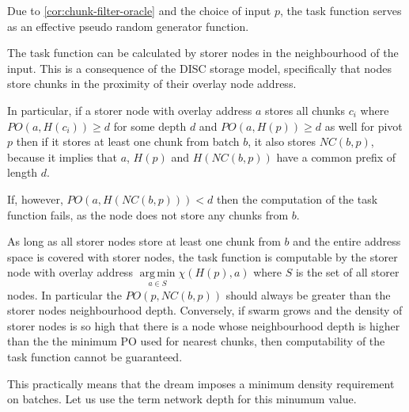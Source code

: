 \begin{corollary}
\label{cor:task-function-oracle}
Due to \ref{cor:chunk-filter-oracle} and the choice of input $p$, the task function serves as an effective pseudo random generator function.
\end{corollary}


\begin{corollary}
\label{cor:task-function-locality}
The task function can be calculated by storer nodes in the neighbourhood of the input. This is a consequence of the DISC storage model, specifically that nodes store chunks in the proximity of their overlay node address.

In particular, if a storer node with overlay address $a$ stores all chunks $c_i$ where $\mathit{PO}(a,\mathit{H}(c_i))\geq d$ for some depth $d$ and $\mathit{PO}(a,\mathit{H}(p))\geq d$ as well for pivot $p$ then if it stores at least one chunk from batch $b$, it also stores $NC(b,p)$, because it implies that $a$, $\mathit{H}(p)$ and $\mathit{H}(NC(b,p))$ have a common prefix of length $d$.

If, however, $\mathit{PO}(a,\mathit{H}(NC(b,p)))<d$ then the computation of the task function fails, as the node does not store any chunks from $b$.

As long as all storer nodes store at least one chunk from $b$ and the entire address space is covered with storer nodes, the task function is computable by the storer node with overlay address $\underset{a\in S}{\operatorname{arg\,min}}\chi(\mathit{H}(p), a)$ where $S$ is the set of all storer nodes.
In particular the $\mathit{PO}(p,\mathit{NC}(b,p))$ should always be greater than the storer nodes neighbourhood depth. Conversely, if swarm grows and the density of storer nodes is so high that there is a node whose neighbourhood  depth is higher than the the minimum PO used for nearest chunks, then computability of the task function cannot be guaranteed. 

This practically means that the dream imposes a minimum density requirement on batches. Let us use the term network depth for this minumum value.

% 
%

\end{corollary} 


